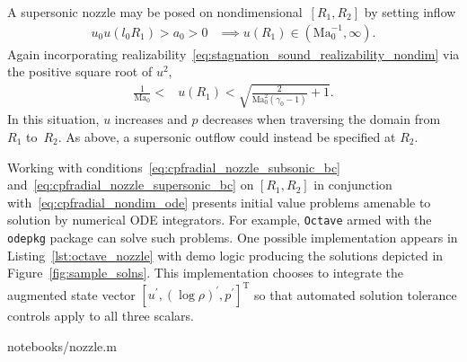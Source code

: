 \documentclass[letterpaper,11pt,nointlimits,reqno]{amsart}
\newcommand{\Mach}[1][]{\mbox{Ma}_{#1}}
\begin{document}
A supersonic nozzle may be posed on nondimensional~$\left[R_{1}, R_{2}\right]$
by setting inflow
\begin{align}
   u_0 u\!\left(l_0 R_{1}\right) > a_0 > 0
   &\implies
   u\!\left(R_{1}\right) \in \left(\Mach[0]^{-1}, \infty\right)
.
\end{align}
Again incorporating
realizability~\eqref{eq:stagnation_sound_realizability_nondim} via the positive
square root of $u^2$,
\begin{align}
  \frac{1}{\Mach[0]} < &u\!\left(R_1\right)
  < \sqrt{\frac{2}{\Mach[0]^2\left(\gamma_0-1\right)}+1}
\label{eq:cpfradial_nozzle_supersonic_bc}
.
\end{align}
In this situation, $u$ increases and $p$ decreases when traversing the domain
from~$R_{1}$ to~$R_{2}$.  As above, a supersonic outflow could instead be
specified at $R_{2}$.

Working with conditions~\eqref{eq:cpfradial_nozzle_subsonic_bc}
and~\eqref{eq:cpfradial_nozzle_supersonic_bc} on $\left[R_1, R_2\right]$ in
conjunction with~\eqref{eq:cpfradial_nondim_ode} presents initial value
problems amenable to solution by numerical ODE integrators.  For example,
\texttt{Octave}\citep{Eaton2008GNU} armed with the \texttt{odepkg} package can
solve such problems.  One possible implementation appears in
Listing~\ref{lst:octave_nozzle} with demo logic producing the solutions
depicted in Figure~\ref{fig:sample_solns}.  This implementation chooses to
integrate the augmented state vector $\left[u^\prime,
\left(\log\rho\right)^\prime, p^\prime\right]^\mathrm{T}$ so that automated
solution tolerance controls apply to all three scalars.


                {notebooks/nozzle.m}
\end{document}
